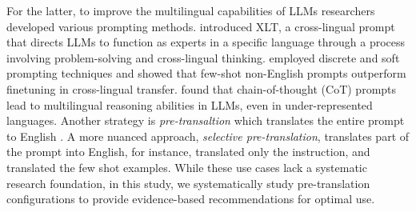 For the latter, to improve the multilingual capabilities of  LLMs
researchers
  developed various prompting methods. \citet{huang2023not} introduced XLT, a cross-lingual prompt that directs LLMs to function as experts in a specific language through a process involving problem-solving and cross-lingual thinking. \citet{zhao2021discrete} employed discrete and soft prompting techniques and showed that few-shot non-English prompts outperform finetuning in cross-lingual transfer. \citet{shi2022language} found that chain-of-thought (CoT) prompts lead to multilingual reasoning abilities in LLMs, even in under-represented languages. Another strategy is \emph{pre-transaltion} which translates the entire prompt to English \citep{chowdhery2023palm, qin2023chatgpt, ahuja2023mega}. A more nuanced approach, \emph{selective pre-translation}, translates part of the prompt into English, for instance, \citet{liu2024translation} translated only the instruction, and \citet{ahuja2023mega} translated the few shot examples. While
these use cases lack a systematic research foundation, in this study, we systematically study pre-translation configurations to provide evidence-based recommendations for optimal use.
